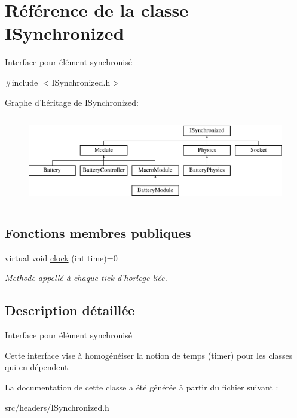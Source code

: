 \hypertarget{classISynchronized}{\section{Référence de la classe I\-Synchronized}
\label{classISynchronized}
}


Interface pour élément synchronisé  




{\ttfamily \#include $<$I\-Synchronized.\-h$>$}

Graphe d'héritage de I\-Synchronized\-:\begin{figure}[H]
\begin{center}
\leavevmode
\includegraphics[height=3.862069cm]{classISynchronized}
\end{center}
\end{figure}
\subsection*{Fonctions membres publiques}
\begin{DoxyCompactItemize}
\item 
\hypertarget{classISynchronized_af7155c662758d6c70f381bb9b11afcd6}{virtual void \hyperlink{classISynchronized_af7155c662758d6c70f381bb9b11afcd6}{clock} (int time)=0}\label{classISynchronized_af7155c662758d6c70f381bb9b11afcd6}

\begin{DoxyCompactList}\small\item\em Methode appellé à chaque tick d'horloge liée. \end{DoxyCompactList}\end{DoxyCompactItemize}


\subsection{Description détaillée}
Interface pour élément synchronisé 

Cette interface vise à homogénéiser la notion de temps (timer) pour les classes qui en dépendent. 

La documentation de cette classe a été générée à partir du fichier suivant \-:\begin{DoxyCompactItemize}
\item 
src/headers/I\-Synchronized.\-h\end{DoxyCompactItemize}
